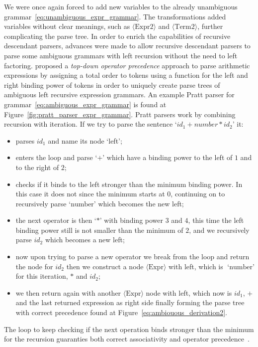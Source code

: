 \documentclass[
  oneside,
  english,
  coorientadorbanca,
  embeddedlogo,
  noabntexcite
]{ufsc-thesis-rn46-2019}
\newcommand{\bnfvars}[1]{\langle\textrm{#1}\rangle}
\newcommand{\bnfter}[1]{\;\bnfters{#1}}
\newcommand{\bnfters}[1]{\textrm{`}\textrm{#1}\textrm{'}}
\begin{document}
We were once again forced to add new variables to the already unambiguous grammar~\eqref{eq:unambiguous_expr_grammar}.
The transformations added variables without clear meanings, such as $\bnfvars{Expr2}$ and $\bnfvars{Term2}$, further complicating the parse tree.
In order to enrich the capabilities of recursive descendant parsers, advances were made to allow recursive descendant parsers to parse some ambiguous grammars with left recursion without the need to left factoring.
\textcite{pratt1973operatorprecedence} proposed a \textit{top-down operator precedence} approach to parse arithmetic expressions by assigning a total order to tokens using a function for the left and right binding power of tokens in order to uniquely create parse trees of ambiguous left recursive expression grammars.
An example Pratt parser for grammar~\eqref{eq:ambiguous_expr_grammar} is found at Figure~\ref{fig:pratt_parser_expr_grammar}.
Pratt parsers work by combining recursion with iteration.
If we try to parse the sentence `$id_1 + number * id_2$' it:
\begin{itemize}
  \item parses $id_1$ and name its node `left';
  \item enters the loop and parse $\bnfters{+}$ which have a binding power to the left of $1$ and to the right of $2$;
  \item checks if it binds to the left stronger than the minimum binding power. In this case it does not since the minimum starts at $0$, continuing on to recursively parse $\bnfters{number}$ which becomes the new left;
  \item the next operator is then $\bnfters{*}$ with binding power $3$ and $4$, this time the left binding power still is not smaller than the minimum of $2$, and we recursively parse $id_2$ which becomes a new left;
  \item now upon trying to parse a new operator we break from the loop and return the node for $id_2$ then we construct a node $\bnfvars{Expr}$ with left, which is $\bnfter{number}$ for this iteration, $*$ and $id_2$;
  \item we then return again with another $\bnfvars{Expr}$ node with left, which now is $id_1$, $+$ and the last returned expression as right side finally forming the parse tree with correct precedence found at Figure~\ref{eq:ambiouous_derivation2}.
\end{itemize}
The loop to keep checking if the next operation binds stronger than the minimum for the recursion guaranties both correct associativity and operator precedence~\cite{pratt1973operatorprecedence}.
\end{document}
